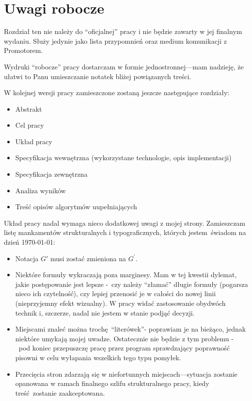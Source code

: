 \chapter{Uwagi robocze}\label{section_notes}
\par{
  Rozdział ten nie należy do ``oficjalnej'' pracy i nie będzie zawarty w jej
 finalnym wydaniu.
 Służy jedynie jako lista przypomnień oraz medium komunikacji z Promotorem.
}
\begin{note}
  Wydruki ``robocze'' pracy dostarczam w formie jednostronnej---mam nadzieję, że
  ułatwi to Panu umieszczanie notatek bliżej powiązanych treści.
\end{note}
\begin{note}
  W kolejnej wersji pracy zamieszczone zostaną jeszcze następujące rozdziały:
  \begin{itemize}
    \item Abstrakt
    \item Cel pracy
    \item Układ pracy
    \item Specyfikacja wewnętrzna (wykorzystane technologie, opis
      implementacji)
    \item Specyfikacja zewnętrzna
    \item Analiza wyników
    \item Treść opisów algorytmów uupełniających
  \end{itemize}
  Układ pracy nadal wymaga nieco dodatkowej uwagi z mojej strony.
  Zamieszczam listę mankamentów strukturalnych i typograficznych, których 
  jestem~świadom na dzień \today:
  \begin{itemize}
    \item Notacja $G\prime$ musi zostać zmieniona na $G^{\prime}$.
    \item Niektóre formuły wykraczają poza marginesy.
      Mam w tej kwestii dylemat, jakie postępowanie jest lepsze -~czy należy
      ``złamać'' długie formuły (pogarsza nieco ich czytelność), czy lepiej 
      przenosić je w całości do nowej linii (nieprzyjemny efekt wizualny).
      W pracy widać zastosowanie obydwóch technik i, szczerze, nadal nie jestem
      w stanie podjąć decyzji.
    \item Miejscami znaleć można trochę ``literówek''- poprawiam je na
      bieżąco, jednak niektóre umykają mojej uwadze.
      Ostatecznie nie będzie z tym problemu -~pod koniec przepuszczę pracę przez
      program sprawdzający poprawność pisowni w celu wyłapania wszelkich tego
      typu pomyłek.
    \item Przecięcia stron zdarzają się w niefortunnych miejscach---sytuacja
      zostanie opanowana w ramach finalnego szlifu strukturalnego pracy, kiedy
      treść~zostanie zaakceptowana.
  \end{itemize}
\end{note}
